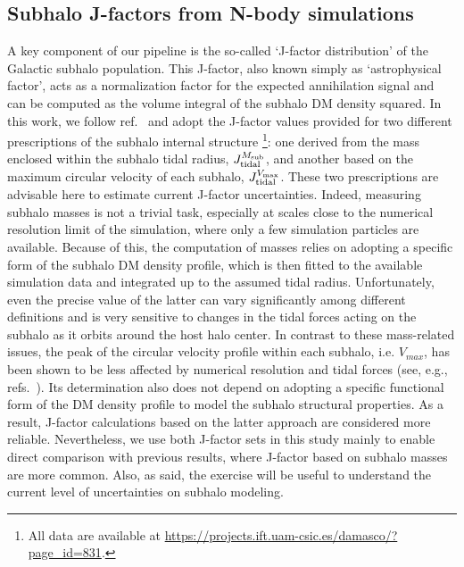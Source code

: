 \documentclass[12pt, a4paper]{article}
\newcommand{\Msub}{M_{\rm sub}}
\newcommand{\Vmax}{V_{\rm max}}
\begin{document}
\subsection{Subhalo J-factors from N-body simulations}
\label{sec:sim-jfactor}
A key component of our pipeline is the so-called ‘J-factor distribution’ of the Galactic subhalo population. This J-factor, also known simply as ‘astrophysical factor’, acts as a normalization factor for the expected annihilation signal and can be computed as the volume integral of the subhalo DM density squared. In this work, we follow ref.~\cite{2024MNRAS.530.2496A} and adopt the J-factor values provided for two different prescriptions of the subhalo internal structure%
\footnote{All data are available at \url{https://projects.ift.uam-csic.es/damasco/?page_id=831}.}: one derived from the mass enclosed within the subhalo tidal radius, $J_{\rm tidal}^{\Msub}$, and another based on the maximum circular velocity of each subhalo, $J_{\rm tidal}^{\Vmax}$. 
These two prescriptions are advisable here to estimate current J-factor uncertainties. 
Indeed, measuring subhalo masses is not a trivial task, especially at scales close to the numerical resolution limit of the simulation, where only a few simulation particles are available. Because of this, the computation of masses relies on adopting a specific form of the subhalo DM density profile, which is then fitted to the available simulation data and integrated up to the assumed tidal radius. Unfortunately, even the precise value of the latter can vary significantly among different definitions and is very sensitive to changes in the tidal forces acting on the subhalo as it orbits around the host halo center. In contrast to these mass-related issues, the peak of the circular velocity profile within each subhalo, i.e. $V_{max}$, has been shown to be less affected by numerical resolution and tidal forces (see, e.g., refs.~\cite{2024MNRAS.530.2496A,2025arXiv250601152A}). Its determination also does not depend on adopting a specific functional form of the DM density profile to model the subhalo structural properties. As a result, J-factor calculations based on the latter approach are considered more reliable. Nevertheless, we use both J-factor sets in this study mainly to enable direct comparison with previous results, where J-factor based on subhalo masses are more common. Also, as said, the exercise will  be useful to understand the current level of uncertainties on subhalo modeling.
\end{document}
